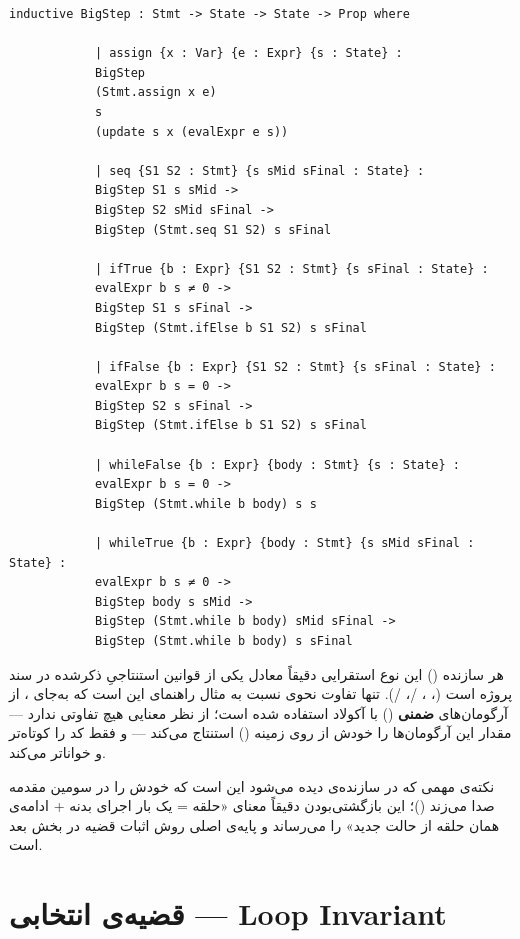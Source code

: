 \documentclass[12pt]{report}
\begin{document}
	\begin{latin}
		\begin{lstlisting}[style=leanstyle]
			inductive BigStep : Stmt -> State -> State -> Prop where
			
			| assign {x : Var} {e : Expr} {s : State} :
			BigStep
			(Stmt.assign x e)
			s
			(update s x (evalExpr e s))
			
			| seq {S1 S2 : Stmt} {s sMid sFinal : State} :
			BigStep S1 s sMid ->
			BigStep S2 sMid sFinal ->
			BigStep (Stmt.seq S1 S2) s sFinal
			
			| ifTrue {b : Expr} {S1 S2 : Stmt} {s sFinal : State} :
			evalExpr b s ≠ 0 ->
			BigStep S1 s sFinal ->
			BigStep (Stmt.ifElse b S1 S2) s sFinal
			
			| ifFalse {b : Expr} {S1 S2 : Stmt} {s sFinal : State} :
			evalExpr b s = 0 ->
			BigStep S2 s sFinal ->
			BigStep (Stmt.ifElse b S1 S2) s sFinal
			
			| whileFalse {b : Expr} {body : Stmt} {s : State} :
			evalExpr b s = 0 ->
			BigStep (Stmt.while b body) s s
			
			| whileTrue {b : Expr} {body : Stmt} {s sMid sFinal : State} :
			evalExpr b s ≠ 0 ->
			BigStep body s sMid ->
			BigStep (Stmt.while b body) sMid sFinal ->
			BigStep (Stmt.while b body) s sFinal
		\end{lstlisting}
	\end{latin}
	
	هر سازنده () این نوع استقرایی دقیقاً معادل یکی از قوانین استنتاجیِ ذکرشده در سند پروژه است (، ، /، /). تنها تفاوت نحوی نسبت به مثال راهنمای  این است که به‌جای ، از آرگومان‌های \textbf{ضمنی} () با آکولاد \lr{\{\}} استفاده شده است؛ از نظر معنایی هیچ تفاوتی ندارد ---  مقدار این آرگومان‌ها را خودش از روی زمینه () استنتاج می‌کند --- و فقط کد را کوتاه‌تر و خواناتر می‌کند.
	
	نکته‌ی مهمی که در سازنده‌ی  دیده می‌شود این است که خودش را در سومین مقدمه صدا می‌زند ()؛ این بازگشتی‌بودن دقیقاً معنای «حلقه = یک بار اجرای بدنه + ادامه‌ی همان حلقه از حالت جدید» را می‌رساند و پایه‌ی اصلی روش اثبات قضیه در بخش بعد است.
	
	\section{قضیه‌ی انتخابی --- Loop Invariant}
	
\end{document}
